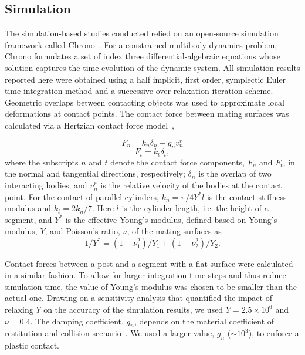\documentclass[aps,pre,twocolumn,superscriptaddress]{revtex4-1}
\begin{document}
\subsection{Simulation}
\label{suppmat:simValidation}

The simulation-based studies conducted relied on an open-source simulation framework called Chrono~\cite{Chrono2016}. For a constrained multibody dynamics problem, Chrono formulates a set of index three differential-algebraic equations whose solution captures the time evolution of the dynamic system. All simulation results reported here were obtained using a half implicit, first order, symplectic Euler time integration method and a successive over-relaxation iteration scheme. Geometric overlaps between contacting objects was used to approximate local deformations at contact points. The contact force between mating surfaces was calculated via a Hertzian contact force model~\cite{johnson1987contact}, 

\begin{equation*}
F_n=k_n \delta_n-g_n v_n^r
\end{equation*}
\begin{equation*}
F_t=k_t \delta_t,
\end{equation*}
where the subscripts $n$ and $t$ denote the contact force components, $F_n$ and $F_t$, in the normal and tangential directions, respectively; $\delta_n$ is the overlap of two interacting bodies; and $v_n^r$ is the relative velocity of the bodies at the contact point. For the contact of parallel cylinders,  $k_n= \pi/4 Y^* l$ is the contact stiffness modulus and $k_t = 2k_n/7$. Here $l$ is the cylinder length, i.e. the height of a segment, and $Y^*$ is the effective Young's modulus, defined based on Young's modulus, $Y$, and Poisson's ratio, $\nu$, of the mating surfaces as
\begin{equation*}
1/Y^* =(1-\nu_1^2)/Y_1 +(1-\nu_2^2)/Y_2.
\end{equation*}

Contact forces between a post and a segment with a flat surface were calculated in a similar fashion. To allow for larger integration time-steps and thus reduce simulation time, the value of Young's modulus was chosen to be smaller than the actual one. Drawing on a sensitivity analysis that quantified the impact of relaxing $Y$ on the accuracy of the simulation results, we used $Y=2.5 \times 10^6$ and $\nu=0.4$. The damping coefficient, $g_n$, depends on the material coefficient of restitution and collision scenario~\cite{machado2012compliant}. We used a larger value, $g_n$ ($\sim 10^3$), to enforce a plastic contact.
\end{document}
